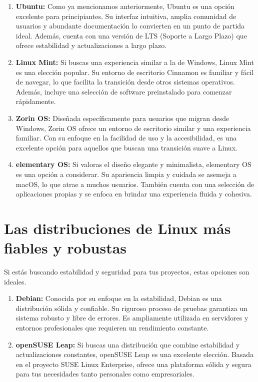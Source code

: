 \documentclass[
  jou,
  floatsintext,
  longtable,
  a4paper,
  nolmodern,
  notxfonts,
  notimes,
  12pt,
  colorlinks=true,linkcolor=blue,citecolor=blue,urlcolor=blue]{apa7}
\begin{document}
\begin{enumerate}
\def\labelenumi{\arabic{enumi}.}
\item
  \textbf{Ubuntu:} Como ya mencionamos anteriormente, Ubuntu es una
  opción excelente para principiantes. Su interfaz intuitiva, amplia
  comunidad de usuarios y abundante documentación lo convierten en un
  punto de partida ideal. Además, cuenta con una versión de LTS (Soporte
  a Largo Plazo) que ofrece estabilidad y actualizaciones a largo plazo.
\item
  \textbf{Linux Mint:} Si buscas una experiencia similar a la de
  Windows, Linux Mint es una elección popular. Su entorno de escritorio
  Cinnamon es familiar y fácil de navegar, lo que facilita la transición
  desde otros sistemas operativos. Además, incluye una selección de
  software preinstalado para comenzar rápidamente.
\item
  \textbf{Zorin OS:} Diseñada específicamente para usuarios que migran
  desde Windows, Zorin OS ofrece un entorno de escritorio similar y una
  experiencia familiar. Con su enfoque en la facilidad de uso y la
  accesibilidad, es una excelente opción para aquellos que buscan una
  transición suave a Linux.
\item
  \textbf{elementary OS:} Si valoras el diseño elegante y minimalista,
  elementary OS es una opción a considerar. Su apariencia limpia y
  cuidada se asemeja a macOS, lo que atrae a muchos usuarios. También
  cuenta con una selección de aplicaciones propias y se enfoca en
  brindar una experiencia fluida y cohesiva.
\end{enumerate}

\section{Las distribuciones de Linux más fiables y
robustas}\label{las-distribuciones-de-linux-muxe1s-fiables-y-robustas}

Si estás buscando estabilidad y seguridad para tus proyectos, estas
opciones son ideales.

\begin{enumerate}
\def\labelenumi{\arabic{enumi}.}
\item
  \textbf{Debian:} Conocida por su enfoque en la estabilidad, Debian es
  una distribución sólida y confiable. Su riguroso proceso de pruebas
  garantiza un sistema robusto y libre de errores. Es ampliamente
  utilizada en servidores y entornos profesionales que requieren un
  rendimiento constante.
\item
  \textbf{openSUSE Leap:} Si buscas una distribución que combine
  estabilidad y actualizaciones constantes, openSUSE Leap es una
  excelente elección. Basada en el proyecto SUSE Linux Enterprise,
  ofrece una plataforma sólida y segura para tus necesidades tanto
  personales como empresariales.
\end{enumerate}
\end{document}
